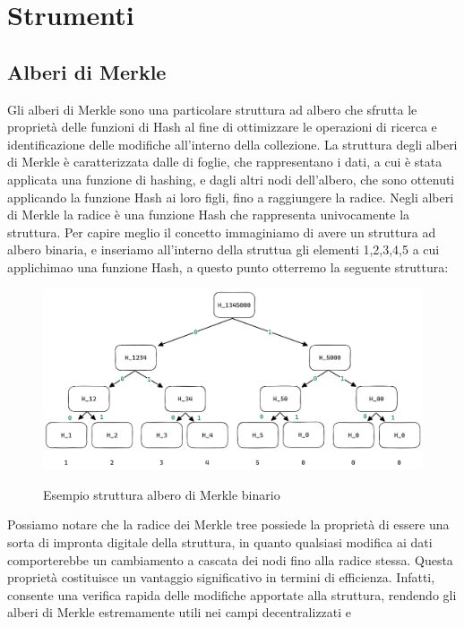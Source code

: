 \section{Strumenti}

\subsection{Alberi di Merkle}
Gli alberi di Merkle sono una particolare struttura ad albero che sfrutta le proprietà delle funzioni di Hash al fine di
ottimizzare le operazioni di ricerca e identificazione delle modifiche all'interno della collezione. La struttura degli
alberi di Merkle è caratterizzata dalle di foglie, che rappresentano i dati, a cui è stata applicata una funzione di
hashing, e dagli altri nodi dell'albero, che sono ottenuti applicando la funzione Hash ai loro figli, fino a raggiungere
la radice. Negli alberi di Merkle la radice è una funzione Hash che rappresenta univocamente la struttura. Per capire
meglio il concetto immaginiamo di avere un struttura ad albero binaria, e inseriamo all'interno della struttua gli
elementi 1,2,3,4,5 a cui applichimao una funzione Hash, a questo punto otterremo la seguente struttura:
\begin{figure}[H]
    \centering
    \includegraphics[width=15cm]{./chapters/2.rln-protocol/images/1.merkle_tree.png}
    \label{fig:merkle_tree}
    \captionsetup{justification=centering}
    \caption{Esempio struttura albero di Merkle binario}
\end{figure}
Possiamo notare che la radice dei Merkle tree possiede la proprietà di essere una sorta di impronta digitale della
struttura, in quanto qualsiasi modifica ai dati comporterebbe un cambiamento a cascata dei nodi fino alla radice stessa.
Questa proprietà costituisce un vantaggio significativo in termini di efficienza. Infatti, consente una verifica rapida
delle modifiche apportate alla struttura, rendendo gli alberi di Merkle estremamente utili nei campi decentralizzati e
